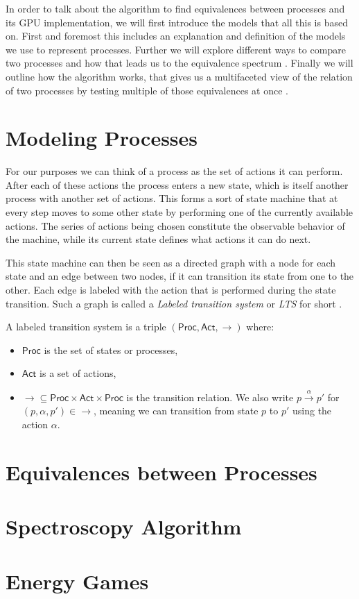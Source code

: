 In order to talk about the algorithm to find equivalences between processes
and its GPU implementation,
we will first introduce the models that all this is based on.
First and foremost this includes an explanation and definition
of the models we use to represent processes.
Further we will explore different ways to compare two processes
and how that leads us to the equivalence spectrum
\cite{glabbeek1990spectrum}.
Finally we will outline how the algorithm works,
that gives us a multifaceted view of the relation of two processes
by testing multiple of those equivalences at once
\cite{bisping2023process}.

\section{Modeling Processes}

For our purposes we can think of a process as the set of actions it can perform.
After each of these actions the process enters a new state,
which is itself another process with another set of actions.
This forms a sort of state machine that at every step
moves to some other state by performing one of the currently available actions.
The series of actions being chosen
constitute the observable behavior of the machine,
while its current state defines what actions it can do next.

This state machine can then be seen as a directed graph
with a node for each state and an edge between two nodes,
if it can transition its state from one to the other.
Each edge is labeled with the action that is performed during the state
transition.
Such a graph is called a \emph{Labeled transition system} or \emph{LTS} for
short
\cite{reactive_systems}.


\begin{definition}
    A labeled transition system is a triple
    $(\mathsf{Proc}, \mathsf{Act}, \rightarrow)$
    where:

    \begin{itemize}
        \item $\mathsf{Proc}$ is the set of states or processes,
        \item $\mathsf{Act}$ is a set of actions,
        \item $\rightarrow \subseteq \mathsf{Proc} \times \mathsf{Act} \times \mathsf{Proc}$
            is the transition relation.
            We also write
            $p \xrightarrow{\alpha} p'$ for $(p, \alpha, p') \in \rightarrow$,
            meaning we can transition from state $p$ to $p'$
            using the action $\alpha$.
    \end{itemize}
\end{definition}


\section{Equivalences between Processes}

\section{Spectroscopy Algorithm}

\section{Energy Games}
